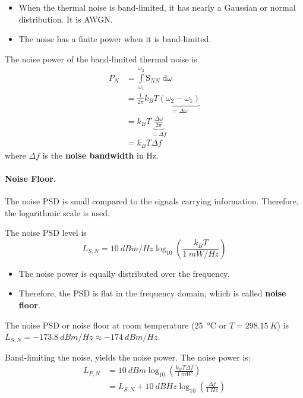 \begin{refsection}
\begin{itemize}
	\item When the thermal noise is band-limited, it has nearly a Gaussian or normal distribution. It is \ac{AWGN}.
	\item The noise has a finite power when it is band-limited.
\end{itemize}
The noise power of the band-limited thermal noise is
\begin{equation}
	\begin{split}
		P_N &= \int\limits_{\omega_1}^{\omega_2} \mathrm{S}_{NN} \; \mathrm{d} \omega \\
		 &= \frac{1}{2\pi} k_B T \underbrace{\left(\omega_2 - \omega_1\right)}_{= \Delta \omega} \\
		 &= k_B T \underbrace{\frac{\Delta \omega}{2\pi}}_{= \Delta f} \\
		 &= k_B T \Delta f
	\end{split}
\end{equation}
where $\Delta f$ is the  \textbf{noise bandwidth} in \si{Hz}.


\paragraph{Noise Floor.}

The noise \ac{PSD} is small compared to the signals carrying information. Therefore, the logarithmic scale is used.

The noise \ac{PSD} level is
\begin{equation}
	L_{S,N} = \SI{10}{dBm/Hz} \log_{10} \left(\frac{k_B T}{\SI{1}{mW/Hz}}\right)
\end{equation}

\begin{itemize}
	\item The noise power is equally distributed over the frequency.
	\item Therefore, the \ac{PSD} is flat in the frequency domain, which is called  \textbf{noise floor}.
\end{itemize}

\begin{fact}
	The noise \ac{PSD} or noise floor at room temperature (\SI{25}{\degreeCelsius} or $T = \SI{298.15}{K}$) is $L_{S,N} = \SI{-173.8}{dBm/Hz} \approx \SI{-174}{dBm/Hz}$.
\end{fact}

Band-limiting the noise, yields the noise power. The noise power is:
\begin{equation}
	\begin{split}
		L_{P,N} &= \SI{10}{dBm} \log_{10} \left(\frac{k_B T \Delta f}{\SI{1}{mW}}\right) \\
		 &= L_{S,N} + \SI{10}{dBHz} \log_{10} \left(\frac{\Delta f}{\SI{1}{Hz}}\right)
	\end{split}
\end{equation}


\end{refsection}
